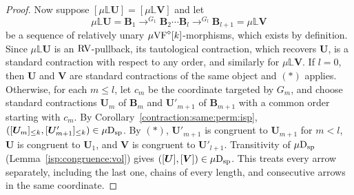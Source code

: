 \documentclass[12pt]{amsart}
\theoremstyle{plain}
\theoremstyle{definition}
\theoremstyle{remark}
\numberwithin{equation}{section}
\theoremstyle{plain}
\newcommand{\VF}{\textup{VF}}
\newcommand{\RV}{\textup{RV}}
\newcommand{\0}{\emptyset}
\newcommand{\bb}[1]{\mathbb{#1}}
\newcommand{\mVF}{{\mu}{\VF}}
\newcommand{\dsp}{\textup{D}_{\textup{sp}}}
\newcommand{\mispdb}{\mu \dsp}
\newcommand{\mL}{{\mu}{\bb L}}
\begin{document}
\begin{proof}
Now suppose $[\mL \bm U] = [\mL \bm V]$ and let
\[
\mu\bb L \bm U = \bm B_1 \to^{G_1} \bm B_2 \cdots \bm B_l \to^{G_l} \bm B_{l+1} = \mu\bb L \bm V
\]
be a sequence of relatively unary $\mVF^\diamond[k]$-morphisms, which exists by definition. Since $\mL \bm U$ is an $\RV$-pullback, its tautological contraction, which recovers $\bm U$, is a standard contraction with respect to any order, and similarly for $\mL \bm V$. If $l = 0$, then $\bm U$ and $\bm V$ are standard contractions of the same object and $(\ast)$ applies. Otherwise, for each $m \leq l$, let $c_m$ be the coordinate targeted by $G_m$, and choose standard contractions $\bm U_m$ of $\bm B_m$ and $\bm U'_{m+1}$ of $\bm B_{m+1}$ with a common order starting with $c_m$. By Corollary~\ref{contraction:same:perm:isp}, $([\bm U_m]_{\leq k}, [\bm U'_{m+1}]_{\leq k}) \in \mispdb$. By $(\ast)$, $\bm U'_{m+1}$ is congruent to $\bm U_{m+1}$ for $m < l$, $\bm U$ is congruent to $\bm U_1$, and $\bm V$ is congruent to $\bm U'_{l+1}$. Transitivity of $\mispdb$ (Lemma~\ref{isp:congruence:vol}) gives $([\bm U], [\bm V]) \in \mispdb$. This treats every arrow separately, including the last one, chains of every length, and consecutive arrows in the same coordinate.
\end{proof}
\end{document}
